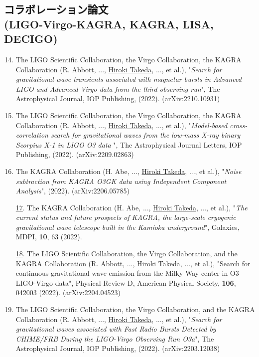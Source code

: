 \documentclass[uplatex, 12pt]{article}
\begin{document}
\subsection*{コラボレーション論文 \\(LIGO-Virgo-KAGRA, KAGRA, LISA, DECIGO)}
\begin{enumerate}
\setcounter{enumi}{13}
\item The LIGO Scientific Collaboration, the Virgo Collaboration, the KAGRA Collaboration (R. Abbott, ..., \uline{Hiroki Takeda}, ..., et al.), "\emph{Search for gravitational-wave transients associated with magnetar bursts in Advanced LIGO and Advanced Virgo data from the third observing run}", The Astrophysical Journal, IOP Publishing, (2022). (arXiv:2210.10931)\\

\item The LIGO Scientific Collaboration, the Virgo Collaboration, the KAGRA Collaboration (R. Abbott, ..., \uline{Hiroki Takeda}, ..., et al.), "\emph{Model-based cross-correlation search for gravitational waves from the low-mass X-ray binary Scorpius X-1 in LIGO O3 data }", The Astrophysical Journal Letters, IOP Publishing, (2022). (arXiv:2209.02863)\\

\item The KAGRA Collaboration (H. Abe, ..., \uline{Hiroki Takeda}, ..., et al.), "\emph{Noise subtraction from KAGRA O3GK data using Independent Component Analysis}", (2022). (arXiv:2206.05785)\\

\item[\uline{17}.] The KAGRA Collaboration (H. Abe, ..., \uline{Hiroki Takeda}, ..., et al.), "\emph{The current status and future prospects of KAGRA, the large-scale cryogenic gravitational wave telescope built in the Kamioka underground}", Galaxies, MDPI, {\bf 10}, 63 (2022). \\

\item[\uline{18}.] The LIGO Scientific Collaboration, the Virgo Collaboration, and the KAGRA Collaboration (R. Abbott, ..., \uline{Hiroki Takeda}, ..., et al.),
"Search for continuous gravitational wave emission from the Milky Way center in O3 LIGO-Virgo data", Physical Review D, American Physical Society, {\bf 106}, 042003 (2022).
(arXiv:2204.04523)\\

\setcounter{enumi}{18}
\item The LIGO Scientific Collaboration, the Virgo Collaboration, and the KAGRA Collaboration (R. Abbott, ..., \uline{Hiroki Takeda}, ..., et al.),
"\emph{Search for gravitational waves associated with Fast Radio Bursts Detected by CHIME/FRB During the LIGO-Virgo Observing Run O3a}",  The Astrophysical Journal, IOP Publishing,  (2022). (arXiv:2203.12038)\\


\end{enumerate}
\end{document}
